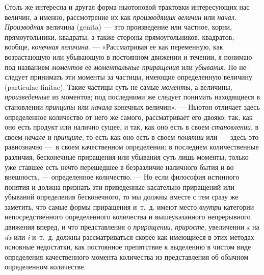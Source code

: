 Столь же интересна и другая форма ньютоновой трактовки интересующих нас
величин, а именно, рассмотрение их как
{\em производящих величин} или
{\em начал}. {\em Производная}
величина (genita) —~это произведение или частное, корни, прямоугольники,
квадраты, а также стороны прямоугольников, квадратов, — вообще,
{\em конечная величина}. — «Рассматривая ее как
переменную, как возрастающую или убывающую в постоянном движении и течении,
я понимаю под названием {\em моментов} ее
{\em моментальные приращения} или
{\em убывания}. Но не следует принимать эти моменты за
частицы, имеющие определенную величину (particulae finitae). Такие частицы
суть не самые {\em моменты}, а величины,
{\em произведенные} из моментов; под последними же
следует понимать находящиеся в становлении
{\em принципы} или {\em начала}
конечных величин». — Ньютон отличает здесь определенное количество от него
же самого, рассматривает его двояко: так, как оно есть продукт или налично
сущее, и так, как оно есть в своем {\em становлении}, в
своем {\em начале} и
{\em принципе}, то есть как оно есть в своем
{\em понятии} или —~здесь это равнозначно —~в своем
качественном определении; в последнем количественные различия, бесконечные
приращения или убывания суть лишь моменты; только уже ставшее есть нечто
перешедшее в безразличие наличного бытия и во внешность, — определенное
количество. — Но если философия истинного понятия и должна признать эти
приведенные касательно приращений или убываний определения бесконечного, то
мы должны вместе с тем сразу же заметить, что самые формы приращения
и~т.~д. имеют место {\em внутри} категории
непосредственного определенного количества и вышеуказанного непрерывного
движения вперед, и что представления о
{\em приращении}, {\em приросте},
увеличении {\em x} на {\em dx} или
{\em i} и~т.~д. должны рассматриваться скорее как
имеющиеся в этих методах основные недостатки, как постоянное препятствие к
выделению в чистом виде определения качественного момента количества из
представления об обычном определенном количестве.

